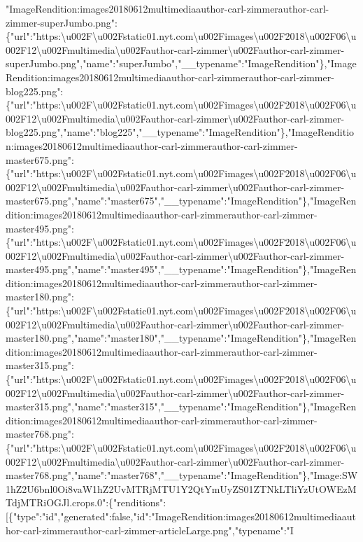 "ImageRendition:images20180612multimediaauthor-carl-zimmerauthor-carl-zimmer-superJumbo.png":\{"url":"https:\textbackslash{}u002F\textbackslash{}u002Fstatic01.nyt.com\textbackslash{}u002Fimages\textbackslash{}u002F2018\textbackslash{}u002F06\textbackslash{}u002F12\textbackslash{}u002Fmultimedia\textbackslash{}u002Fauthor-carl-zimmer\textbackslash{}u002Fauthor-carl-zimmer-superJumbo.png","name":"superJumbo","\_\_typename":"ImageRendition"\},"ImageRendition:images20180612multimediaauthor-carl-zimmerauthor-carl-zimmer-blog225.png":\{"url":"https:\textbackslash{}u002F\textbackslash{}u002Fstatic01.nyt.com\textbackslash{}u002Fimages\textbackslash{}u002F2018\textbackslash{}u002F06\textbackslash{}u002F12\textbackslash{}u002Fmultimedia\textbackslash{}u002Fauthor-carl-zimmer\textbackslash{}u002Fauthor-carl-zimmer-blog225.png","name":"blog225","\_\_typename":"ImageRendition"\},"ImageRendition:images20180612multimediaauthor-carl-zimmerauthor-carl-zimmer-master675.png":\{"url":"https:\textbackslash{}u002F\textbackslash{}u002Fstatic01.nyt.com\textbackslash{}u002Fimages\textbackslash{}u002F2018\textbackslash{}u002F06\textbackslash{}u002F12\textbackslash{}u002Fmultimedia\textbackslash{}u002Fauthor-carl-zimmer\textbackslash{}u002Fauthor-carl-zimmer-master675.png","name":"master675","\_\_typename":"ImageRendition"\},"ImageRendition:images20180612multimediaauthor-carl-zimmerauthor-carl-zimmer-master495.png":\{"url":"https:\textbackslash{}u002F\textbackslash{}u002Fstatic01.nyt.com\textbackslash{}u002Fimages\textbackslash{}u002F2018\textbackslash{}u002F06\textbackslash{}u002F12\textbackslash{}u002Fmultimedia\textbackslash{}u002Fauthor-carl-zimmer\textbackslash{}u002Fauthor-carl-zimmer-master495.png","name":"master495","\_\_typename":"ImageRendition"\},"ImageRendition:images20180612multimediaauthor-carl-zimmerauthor-carl-zimmer-master180.png":\{"url":"https:\textbackslash{}u002F\textbackslash{}u002Fstatic01.nyt.com\textbackslash{}u002Fimages\textbackslash{}u002F2018\textbackslash{}u002F06\textbackslash{}u002F12\textbackslash{}u002Fmultimedia\textbackslash{}u002Fauthor-carl-zimmer\textbackslash{}u002Fauthor-carl-zimmer-master180.png","name":"master180","\_\_typename":"ImageRendition"\},"ImageRendition:images20180612multimediaauthor-carl-zimmerauthor-carl-zimmer-master315.png":\{"url":"https:\textbackslash{}u002F\textbackslash{}u002Fstatic01.nyt.com\textbackslash{}u002Fimages\textbackslash{}u002F2018\textbackslash{}u002F06\textbackslash{}u002F12\textbackslash{}u002Fmultimedia\textbackslash{}u002Fauthor-carl-zimmer\textbackslash{}u002Fauthor-carl-zimmer-master315.png","name":"master315","\_\_typename":"ImageRendition"\},"ImageRendition:images20180612multimediaauthor-carl-zimmerauthor-carl-zimmer-master768.png":\{"url":"https:\textbackslash{}u002F\textbackslash{}u002Fstatic01.nyt.com\textbackslash{}u002Fimages\textbackslash{}u002F2018\textbackslash{}u002F06\textbackslash{}u002F12\textbackslash{}u002Fmultimedia\textbackslash{}u002Fauthor-carl-zimmer\textbackslash{}u002Fauthor-carl-zimmer-master768.png","name":"master768","\_\_typename":"ImageRendition"\},"Image:SW1hZ2U6bnl0Oi8vaW1hZ2UvMTRjMTU1Y2QtYmUyZS01ZTNkLTliYzUtOWEzMTdjMTRiOGJl.crops.0":\{"renditions":{[}\{"type":"id","generated":false,"id":"ImageRendition:images20180612multimediaauthor-carl-zimmerauthor-carl-zimmer-articleLarge.png","typename":"I